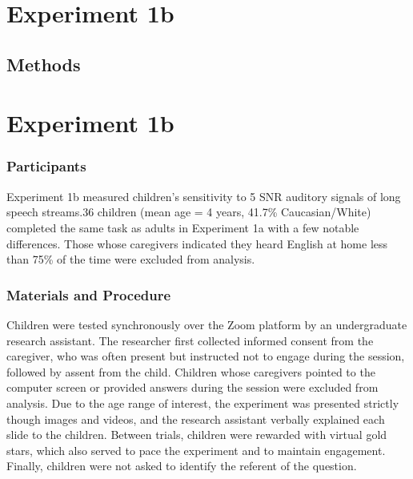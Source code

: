 \documentclass[10pt, letterpaper]{article}
\begin{document}
\hypertarget{experiment-1b}{%
\section{Experiment 1b}\label{experiment-1b}}

\hypertarget{methods-1}{%
\subsection{Methods}\label{methods-1}}

\hypertarget{experiment-1b-1}{%
\section{Experiment 1b}\label{experiment-1b-1}}

\hypertarget{participants-1}{%
\subsubsection{Participants}\label{participants-1}}

Experiment 1b measured children's sensitivity to 5 SNR auditory signals
of long speech streams.36 children (mean age = 4 years, 41.7\%
Caucasian/White) completed the same task as adults in Experiment 1a with
a few notable differences. Those whose caregivers indicated they heard
English at home less than 75\% of the time were excluded from analysis.

\hypertarget{materials-and-procedure-1}{%
\subsubsection{Materials and
Procedure}\label{materials-and-procedure-1}}

Children were tested synchronously over the Zoom platform by an
undergraduate research assistant. The researcher first collected
informed consent from the caregiver, who was often present but
instructed not to engage during the session, followed by assent from the
child. Children whose caregivers pointed to the computer screen or
provided answers during the session were excluded from analysis. Due to
the age range of interest, the experiment was presented strictly though
images and videos, and the research assistant verbally explained each
slide to the children. Between trials, children were rewarded with
virtual gold stars, which also served to pace the experiment and to
maintain engagement. Finally, children were not asked to identify the
referent of the question.
\end{document}

